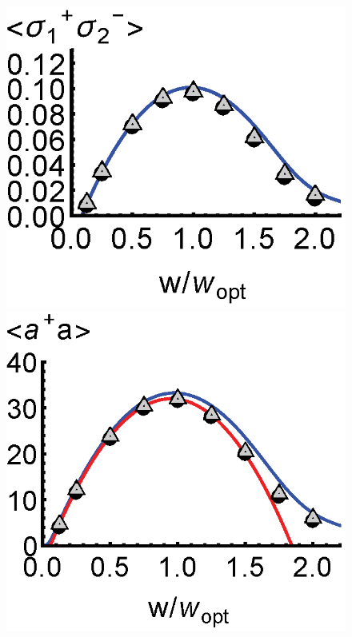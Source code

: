 \documentclass[aps,prl,twocolumn,
superscriptaddress,groupedaddress]{revtex4}
\begin{document}
\begin{figure}
\begin{center}
	\hspace{-5.0mm} \includegraphics[scale =0.38] {N40CrossoverSPSM.eps}
	\hspace{-5.0mm} \includegraphics[scale =0.38] {N40Crossoverada.eps}

\end{center}
\end{figure}
\end{document}

